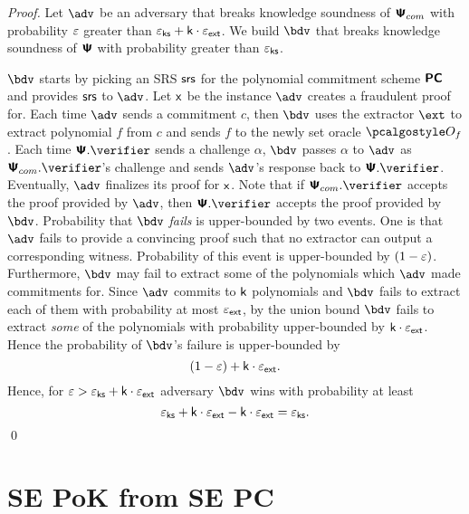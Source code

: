 \documentclass[runningheads,11pt]{llncs}
\begin{document}
\begin{proof}
  Let $\adv$ be an adversary that breaks knowledge soundness of $\bm{\mathsf{\Psi}}_{com}$ with
  probability $\varepsilon$ greater than $\varepsilon_{\mathsf{ks}} + \mathsf{k} \cdot \varepsilon_{\mathsf{ext}}$. We build
  $\bdv$ that breaks knowledge soundness of $\bm{\mathsf{\Psi}}$ with probability greater than
  $\varepsilon_{\mathsf{ks}}$.

  $\bdv$ starts by picking an SRS $\mathsf{srs}$ for the polynomial commitment scheme
  $\bm{\mathsf{PC}}$ and provides $\mathsf{srs}$ to $\adv$. Let $\mathsf{x}$ be the instance $\adv$
  creates a fraudulent proof for. Each time $\adv$ sends a commitment $c$, then
  $\bdv$ uses the extractor $\ext$ to extract polynomial $f$ from $c$ and sends
  $f$ to the newly set oracle $\oracleo_f$.    Each time $\PS.\verifier$ sends a
  challenge $\alpha$, $\bdv$ passes $\alpha$ to $\adv$ as $\PSc.\verifier$'s
  challenge and sends $\adv$'s response back to $\PS.\verifier$. Eventually,
  $\adv$ finalizes its proof for $\mathsf{x}$. Note that if $\PSc.\verifier$ accepts
  the proof provided by $\adv$, then $\PS.\verifier$ accepts the proof provided
  by $\bdv$. Probability that $\bdv$ \emph{fails} is upper-bounded by two
  events. One is that $\adv$ fails to provide a convincing proof such that no
  extractor can output a corresponding witness. Probability of this event is
  upper-bounded by $(1 - \varepsilon)$. Furthermore, $\bdv$ may fail to extract some
  of the polynomials which $\adv$ made commitments for. Since $\adv$ commits to
  $\mathsf{k}$ polynomials and $\bdv$ fails to extract each of them with probability
  at most $\varepsilon_{\mathsf{ext}}$, by the union bound $\bdv$ fails to extract \emph{some} of
  the polynomials with probability upper-bounded by $\mathsf{k} \cdot
  \varepsilon_{\mathsf{ext}}$. Hence the probability of $\bdv$'s failure is upper-bounded by
  \[
    (1 - \varepsilon) + \mathsf{k} \cdot \varepsilon_{\mathsf{ext}}.
  \]
  Hence, for $\varepsilon > \varepsilon_{\mathsf{ks}} + \mathsf{k} \cdot \varepsilon_{\mathsf{ext}}$ adversary $\bdv$ wins with probability at least
  \[
    \varepsilon_{\mathsf{ks}} + \mathsf{k} \cdot \varepsilon_{\mathsf{ext}} - \mathsf{k} \cdot \varepsilon_{\mathsf{ext}}  = \varepsilon_{\mathsf{ks}}.
  \]
  \qed
\end{proof}

\section{SE PoK from SE PC}
\end{document}
